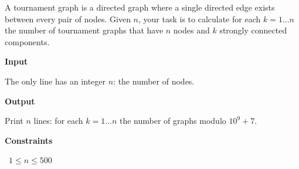 A tournament graph is a directed graph where a single directed edge exists between every pair of nodes.
Given $n$, your task is to calculate for each $k = 1 \dots n$ the number of tournament graphs that have $n$ nodes and $k$ strongly connected components.

\vspace{0.3cm}\noindent\textbf{Input}

The only line has an integer $n$: the number of nodes.

\vspace{0.3cm}\noindent\textbf{Output}

Print $n$ lines: for each $k=1 \dots n$ the number of graphs modulo $10^9+7$.

\vspace{0.3cm}\noindent\textbf{Constraints}

\textbullet\ $1 \le n \le 500$